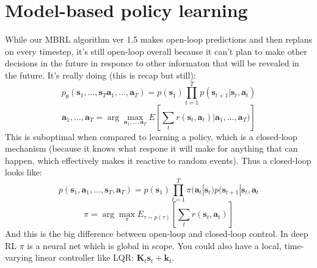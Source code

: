 \documentclass{report}
\newcommand{\argmax}{\arg\!\max}
\begin{document}
\section{Model-based policy learning}
While our MBRL algorithm ver 1.5 makes open-loop predictions and then replans on every timestep, 
it's still open-loop overall because it can't plan to make other decisions in the future in responce to other informaton 
that will be revealed in the future.
It's really doing (this is recap but still):
\begin{equation}
		p_\theta ( \bm{s}_{1}, \dots , \bm{s}_{T} \bm{a}_{1}, \dots , \bm{a}_{T}) =
		p(\bm{s}_{1}) \prod_{t=1}^{T} p(\bm{s}_{t+1} | \bm{s}_{t}, \bm{a}_{t}) 
\end{equation}
\begin{equation}
		\bm{a}_{1}, \dots , \bm{a}_{T} = \argmax_{\bm{a}_{1}, \dots , \bm{a}_{T}} E \left[ 
		\sum_{t}^{} r (\bm{s}_{t}, \bm{a}_{t} )| \bm{a}_{1}, \dots , \bm{a}_{T})\right] 
\end{equation}
This is suboptimal when compared to learning a policy, which is a closed-loop mechanism (because it knows
what respone it will make for anything that can happen, which effectively makes it reactive to random events).
Thus a closed-loop looks like:
\begin{equation}
		p(\bm{s}_{1}, \bm{a}_{1}, \dots, \bm{s}_{T}, \bm{a}_{T}) =
		p(\bm{s}_{1}) \prod_{t=1}^{T} \pi(\bm{a}_{t}| \bm{s}_{t}) p(\bm{s}_{t+1}| \bm{s}_{t}, \bm{a}_{t} 
\end{equation}
\begin{equation}
		\pi = \argmax_\pi E_{\tau \sim p(\tau)} \left[ \sum_{t}^{} r (\bm{s}_{t}, \bm{a}_{t} ) \right] 
\end{equation}
And this is the big difference between open-loop and closed-loop control.
In deep RL $\pi$ is a neural net which is global in scope.
You could also have a local, time-varying linear controller like LQR: $\bm{K}_{t}\bm{s}_{t} + \bm{k}_{t}$.
\end{document}
